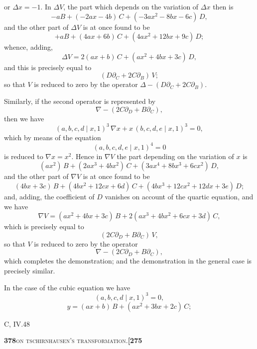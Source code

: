 \documentclass[11pt]{article}
\newcommand{\Cdel}{\mid}
\begin{document}
\medskip

\noindent or $\Delta x = -1$. In $\Delta V$, the part which depends on the variation of $\Delta x$ then is
\[
-a B + (-2 a x - 4 b)\, C + (-3 a x^2 - 8 b x - 6 c)\, D,
\]
and the other part of $\Delta V$ is at once found to be
\[
+ a B + (4 a x + 6 b)\, C + (4 a x^2 + 12 b x + 9 c)\, D;
\]
whence, adding,
\[
\Delta V = 2(a x + b)\, C + (a x^2 + 4 b x + 3 c)\, D,
\]
and this is precisely equal to
\[
(D \partial_C + 2 C \partial_B)\, V;
\]
so that $V$ is reduced to zero by the operator $\Delta - (D \partial_C + 2 C \partial_B)$.

\medskip

Similarly, if the second operator is represented by
\[
\nabla - (2 C \partial_D + B \partial_C),
\]
then we have
\[
(a, b, c, d \Cdel x, 1)^3\, \nabla x + x\,(b, c, d, e \Cdel x, 1)^3 = 0,
\]
which by means of the equation
\[
(a, b, c, d, e \Cdel x, 1)^4 = 0
\]
is reduced to $\nabla x = x^2$. Hence in $\nabla V$ the part depending on the variation of $x$ is
\[
(a x^2)\, B + (2 a x^3 + 4 b x^2)\, C + (3 a x^4 + 8 b x^3 + 6 c x^2)\, D,
\]
and the other part of $\nabla V$ is at once found to be
\[
(4 b x + 3 c)\, B + (4 b x^2 + 12 c x + 6 d)\, C + (4 b x^3 + 12 c x^2 + 12 d x + 3 e)\, D;
\]
and, adding, the coefficient of $D$ vanishes on account of the quartic equation, and we have
\[
\nabla V = (a x^2 + 4 b x + 3 c)\, B + 2(a x^3 + 4 b x^2 + 6 c x + 3 d)\, C,
\]
which is precisely equal to
\[
(2 C \partial_D + B \partial_C)\, V,
\]
so that $V$ is reduced to zero by the operator
\[
\nabla - (2 C \partial_D + B \partial_C),
\]
which completes the demonstration; and the demonstration in the general case is precisely similar.

\medskip

In the case of the cubic equation we have
\[
(a, b, c, d \Cdel x, 1)^3 = 0,
\]
\[
y = (a x + b)\, B + (a x^2 + 3 b x + 2 c)\, C;
\]

\hfill C, IV.\hfill 48

\newpage
\noindent\textbf{378}\hfill\textsc{on tschirnhausen's transformation.}\hfill\textbf{[275}

\medskip
\end{document}
